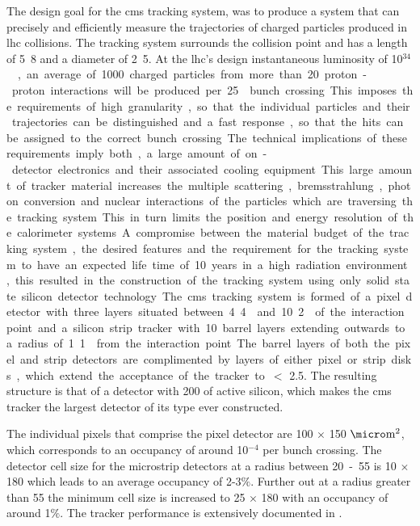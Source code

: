 The design goal for the \ac{cms} tracking system, was to produce a system that
can precisely and efficiently measure the trajectories of charged particles
produced in \ac{lhc} collisions. The tracking system surrounds the collision
point and has a length of \unit{5.8}{\meter} and a diameter of
\unit{2.5}{\meter}. At the \ac{lhc}'s design instantaneous luminosity of
\unit{10$^{34}$}{\lumiunits}, an average of 1000 charged particles from more
than 20 proton-proton interactions will be produced per \unit{25}{\nano\second}
bunch crossing. This imposes the requirements of high granularity, so that the
individual particles and their trajectories can be distinguished and a fast
response, so that the hits can be assigned to the correct bunch crossing. The
technical implications of these requirements imply both, a large amount of
on-detector electronics and their associated cooling equipment. This large
amount of tracker material increases the multiple scattering, bremsstrahlung,
photon conversion and nuclear interactions of the particles which are
traversing the tracking system. This in turn limits the position and energy
resolution of the calorimeter systems. A compromise between the material budget
of the tracking system, the desired features and the requirement for the
tracking system to have an expected life time of 10 years in a high radiation
environment, this resulted in the construction of the tracking system using
only solid state silicon detector technology.

The \ac{cms} tracking system is formed of a pixel detector with three layers
situated between \unit{4.4}{\cm} and \unit{10.2}{\cm} of the interaction point
and a silicon strip tracker with 10 barrel layers extending outwards to a
radius of \unit{1.1}{\meter} from the interaction point. The barrel layers of
both the pixel and strip detectors are complimented by layers of either pixel
or strip disks, which extend the acceptance of the tracker to \mETA $<$ 2.5. The
resulting structure is that of a detector with \unit{200}{\squaremetre} of
active silicon, which makes the \ac{cms} tracker the largest detector of its
type ever constructed.

The individual pixels that comprise the pixel detector are 100 $\times$
150 $\micro\textrm{m}^{2}$, which corresponds to an occupancy of around
10$^{-4}$ per bunch crossing. The detector cell size for the microstrip
detectors at a radius between \unit{20-55}{\cm} is \unit{10}{\cm} $\times$
\unit{180}{\micro\meter} which leads to an average occupancy of 2-3$\%$.
Further out at a radius greater than \unit{55}{\cm}  the minimum cell size is
increased to \unit{25}{\cm} $\times$ \unit{180}{\micro\meter} with an occupancy
of around 1$\%$. The tracker performance is extensively documented in
\cite{cmstracking}.

